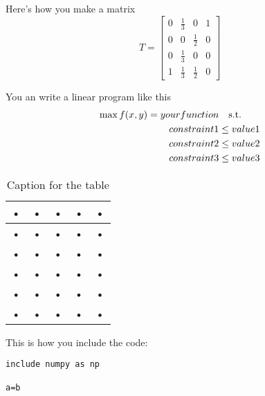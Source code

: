 \documentclass[11pt]{article}
\begin{document}



Here's how you make a matrix
\begin{equation*}
T = \begin{bmatrix}
0 & {\frac{1}{3}} & 0 & {1} \\
0 & 0 & {\frac{1}{2}}& 0 \\
0 &{\frac{1}{3}} & 0 & 0 \\
{1} &{\frac{1}{3}} & {\frac{1}{2}} & 0
\end{bmatrix}
\end{equation*}

You an write a linear program like this
\begin{align*}
 \operatorname{max} f(x,y) = your function & \text{\quad s.t.} \\
constraint 1  &\leq  value 1 \\
constraint 2 &\leq value 2 \\
constraint 3 &\leq value 3 
\end{align*}

\begin{table}[H]
\begin{center}
\begin{tabular}{|c|c|c|c|c|}
\hline 
• & • & • & • & • \\ 
\hline 
• & • & • & • & • \\ 
\hline 
• & • & • & • & • \\ 
\hline 
• & • & • & • & • \\ 
\hline 
• & • & • & • & • \\ 
\hline 
• & • & • & • & • \\ 
\hline 

\end{tabular} 
\caption{Caption for the table}
\end{center}
\end{table}

This is how you include the code:
\begin{lstlisting}
include numpy as np

a=b
\end{lstlisting}
\end{document}

